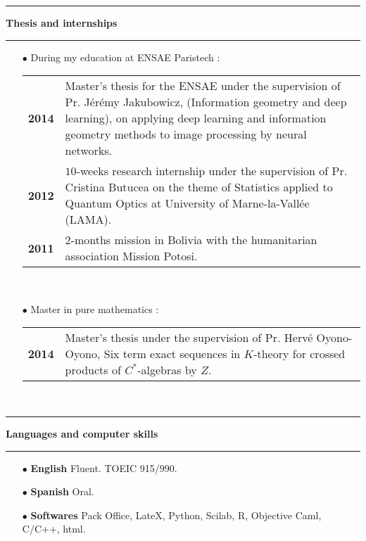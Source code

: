 \documentclass[a4paper,11pt]{article}
\newcommand\espace{\vrule height 20pt width 0pt}
\newcommand{\titre}[1]{%
	\begin{center}
	\bigskip
	\rule{\textwidth}{1pt}
	\par\vspace{0.1cm}
        \textbf{\large #1}
	\par\rule{\textwidth}{1pt}
	\end{center}
	\bigskip
	}
\begin{document}
\titre{Thesis and internships}
\begin{itemize}
\medskip
\item[$\bullet$] During my education at ENSAE Paristech : \\

\begin{tabular}{cp{}}
\textbf{2014} & Master's thesis for the ENSAE under the supervision of Pr. Jérémy Jakubowicz, (Information geometry and deep learning), on applying deep learning and information geometry methods to image processing by neural networks.\\
\textbf{2012}&  $10$-weeks research internship under the supervision of Pr. Cristina Butucea on the theme of Statistics applied to Quantum Optics at University of Marne-la-Vallée (LAMA).		\\
\textbf{2011} & $2$-months mission in Bolivia with the humanitarian association Mission Potosi.\\
\end{tabular}
\\
\espace
\item[$\bullet$] Master in pure mathematics : \\

\begin{tabular}{cp{}}
\textbf{2014} & Master's thesis under the supervision of Pr. Hervé Oyono-Oyono, Six term exact sequences in $K$-theory for crossed products of $C^*$-algebras by $Z$.
\end{tabular}
\\
\medskip
\end{itemize}



\titre{Languages and computer skills}

\begin{itemize} 
\medskip
\item[$\bullet$] \textbf{English} Fluent. TOEIC 915/990.
\medskip
\item[$\bullet$] \textbf{Spanish} Oral.
\medskip
\item[$\bullet$] \textbf{Softwares} Pack Office, LateX, Python, Scilab, R, Objective Caml, C/C++, html.
\end{itemize}
\end{document}
